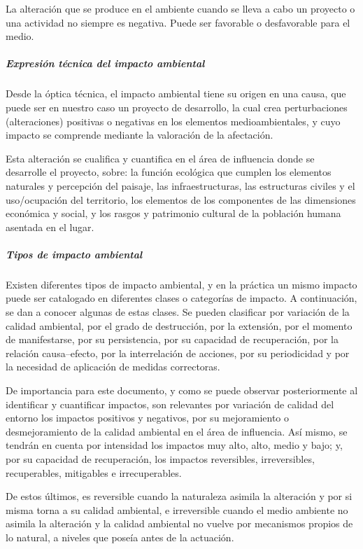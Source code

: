 La alteración que se produce en el ambiente cuando se lleva a cabo un proyecto o una actividad no siempre es negativa.
Puede ser favorable o desfavorable para el medio. 

	\subparagraph{Expresión técnica del impacto ambiental}

Desde la óptica técnica, el impacto ambiental tiene su origen en una causa, que puede ser en nuestro caso un proyecto de desarrollo, la cual crea perturbaciones (alteraciones) positivas o negativas en los  elementos  medioambientales, y cuyo impacto se comprende mediante la  valoración  de  la afectación. 
 
Esta alteración se cualifica y cuantifica en el área de influencia donde se desarrolle el proyecto, sobre: la función ecológica que cumplen los elementos naturales y percepción del paisaje, 
las infraestructuras, las estructuras civiles y el uso/ocupación del territorio, los elementos de los componentes de las dimensiones económica y social, y los rasgos y patrimonio cultural de la población humana asentada en el lugar.

	\subparagraph{Tipos de impacto ambiental}
 
Existen diferentes tipos de impacto ambiental, y en la práctica un mismo impacto puede ser catalogado en diferentes clases o categorías de impacto.
A continuación, se dan a conocer algunas de estas clases. Se pueden clasificar por variación de la calidad ambiental, por el grado de  destrucción, por la extensión,  por  el  momento  de  manifestarse,  por  su  persistencia,  por  su capacidad  de  recuperación,  por  la  relación  causa–efecto,  por  la  interrelación  de  acciones,  por  su periodicidad y por la necesidad de aplicación de medidas correctoras. 
 
 
De importancia para este documento, y como se puede observar posteriormente al identificar y cuantificar impactos, son relevantes por variación de calidad del entorno los impactos positivos y negativos,  por  su  mejoramiento  o  desmejoramiento  de  la  calidad  ambiental  en  el  área  de influencia.
Así mismo, se tendrán en cuenta por intensidad los impactos muy alto, alto, medio y bajo; y, por su capacidad de recuperación, los impactos reversibles, irreversibles, recuperables, mitigables e irrecuperables.  

De estos últimos, es reversible cuando la naturaleza asimila la alteración y por si misma torna a su  calidad  ambiental, e irreversible cuando el medio  ambiente  no  asimila  la alteración  y  la calidad ambiental  no  vuelve  por  mecanismos  propios  de  lo  natural,  a  niveles  que  poseía  antes  de  la actuación. 
 
